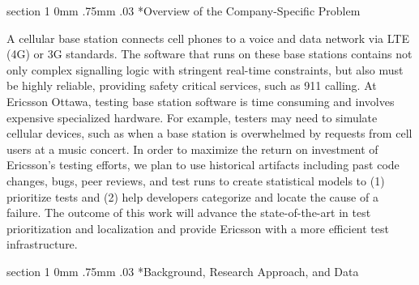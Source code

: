 \documentclass[12pt, letterpaper]{article}
\makeatletter
\renewcommand{\section}{\@startsection
{section}%
{1}%
{0mm}%
{.75mm}
{.03\baselineskip}%
{\normalfont\large\bf} %
}
\makeatother
\begin{document}
\fancyhead{}
\pagestyle{fancy}
\renewcommand{\headrulewidth}{0pt}

\begin{center}
\begin{LARGE}
\noindent
{}
\end{LARGE}
\end{center}

\section*{Overview of the Company-Specific Problem}

A cellular base station connects cell phones to a voice and data network via
LTE (4G) or 3G standards. The software that runs on these base stations
contains not only complex signalling logic with stringent real-time constraints,
but also must be highly reliable, providing safety critical services, such as
911 calling. At Ericsson Ottawa, testing base station software is time
consuming and involves expensive specialized hardware. For example, testers may
need to simulate cellular devices, such as when a base station is overwhelmed
by requests from cell users at a music concert. In order to maximize the return
on investment of Ericsson's testing efforts, we plan to use historical
artifacts including past code changes, bugs, peer reviews, and test runs to create
statistical models to (1) prioritize tests and (2) help developers
categorize and locate the cause of a failure. The outcome of this work will
advance the state-of-the-art in test prioritization and localization and
provide Ericsson with a more efficient test infrastructure.

\section*{Background, Research Approach, and Data}
\end{document}
